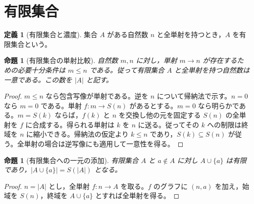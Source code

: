\documentclass[a5paper,10pt,dvipdfmx]{jsarticle}
\theoremstyle{definition}
\newtheorem{defn}[ruledef]{定義}
\theoremstyle{plain}
\newtheorem{prop}[ruledef]{命題}
\begin{document}
\section{有限集合}
\begin{defn}[有限集合と濃度]\label{k110}
集合 $A$ がある自然数 $n$ と全単射を持つとき，$A$ を有限集合という。
\end{defn}
\begin{prop}[有限集合の単射比較]\label{k111}
自然数 $m,n$ に対し，単射 $m\to n$ が存在するための必要十分条件は $m\leq n$ である。従って有限集合 $A$ と全単射を持つ自然数は一意である。この数を $|A|$ と記す。
\end{prop}
\begin{proof}
$m\leq n$ なら包含写像が単射である。逆を $n$ について帰納法で示す。$n=0$ なら $m=0$ である。単射 $f\colon m\to S(n)$ があるとする。$m=0$ なら明らかである。$m=S(k)$ ならば，$f(k)$ と $n$ を交換し他の元を固定する $S(n)$ の全単射を $f$ に合成する。得られる単射は $k$ を $n$ に送る。従ってその $k$ への制限は終域を $n$ に縮小できる。帰納法の仮定より $k\leq n$ であり，$S(k)\subseteq S(n)$ が従う。全単射の場合は逆写像にも適用して一意性を得る。
\end{proof}
\begin{prop}[有限集合への一元の添加]\label{k112}
有限集合 $A$ と $a\notin A$ に対し $A\cup\{a\}$ は有限であり，$|A\cup\{a\}|=S(|A|)$ となる。
\end{prop}
\begin{proof}
$n=|A|$ とし，全単射 $f\colon n\to A$ を取る。$f$ のグラフに $(n,a)$ を加え，始域を $S(n)$，終域を $A\cup\{a\}$ とすれば全単射を得る。
\end{proof}
\end{document}
